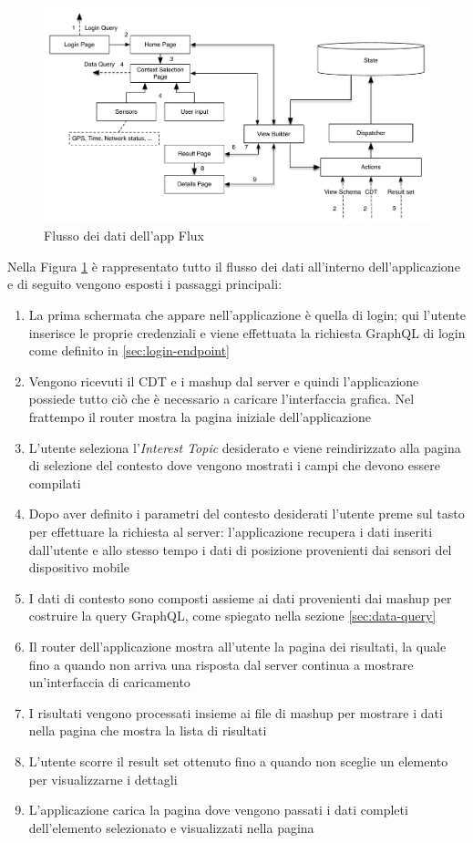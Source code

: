 \begin{figure}[H]
	\centering
	\includegraphics[width=\textwidth]{6-implementazione-app/immagini/app_dataflow.pdf}
	\caption{Flusso dei dati dell'app Flux}\label{fig:app-dataflow}
\end{figure}

Nella Figura \ref{fig:app-dataflow} è rappresentato tutto il flusso dei dati all'interno dell'ap\-pli\-ca\-zio\-ne e di seguito vengono esposti i passaggi principali:

\begin{enumerate}
	\item
	La prima schermata che appare nell'applicazione è quella di login; qui l'utente inserisce le proprie credenziali e viene effettuata la richiesta GraphQL di login come definito in \ref{sec:login-endpoint}
	\item
	Vengono ricevuti il CDT e i mashup dal server e quindi l'applicazione possiede tutto ciò che è necessario a caricare l'interfaccia grafica. Nel frattempo il router mostra la pagina iniziale dell'applicazione
	\item
	L'utente seleziona l'\emph{Interest Topic} desiderato e viene reindirizzato alla pagina di selezione del contesto dove vengono mostrati i campi che devono essere compilati
	\item
	Dopo aver definito i parametri del contesto desiderati l'utente preme sul tasto per effettuare la richiesta al server: l'applicazione recupera i dati inseriti dall'utente e allo stesso tempo i dati di posizione provenienti dai sensori del dispositivo mobile
	\item
	I dati di contesto sono composti assieme ai dati provenienti dai mashup per costruire la query GraphQL, come spiegato nella sezione \ref{sec:data-query}
	\item
	Il router dell'applicazione mostra all'utente la pagina dei risultati, la quale fino a quando non arriva una risposta dal server continua a mostrare un'interfaccia di caricamento
	\item
	I risultati vengono processati insieme ai file di mashup per mostrare i dati nella pagina che mostra la lista di risultati
	\item
	L'utente scorre il result set ottenuto fino a quando non sceglie un elemento per visualizzarne i dettagli
	\item
	L'applicazione carica la pagina dove vengono passati i dati completi dell'e\-le\-men\-to selezionato e visualizzati nella pagina
\end{enumerate}

